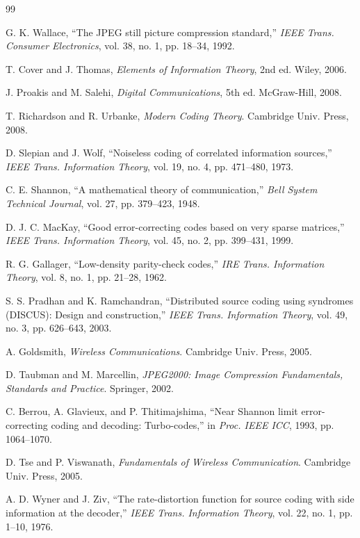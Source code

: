 \documentclass[12pt, a4paper]{article}
\begin{document}
\begin{thebibliography}{99}

G. K. Wallace, ``The JPEG still picture compression standard,'' \textit{IEEE Trans. Consumer Electronics}, vol. 38, no. 1, pp. 18--34, 1992.

T. Cover and J. Thomas, \textit{Elements of Information Theory}, 2nd ed. Wiley, 2006.

J. Proakis and M. Salehi, \textit{Digital Communications}, 5th ed. McGraw-Hill, 2008.

T. Richardson and R. Urbanke, \textit{Modern Coding Theory}. Cambridge Univ. Press, 2008.

D. Slepian and J. Wolf, ``Noiseless coding of correlated information sources,'' \textit{IEEE Trans. Information Theory}, vol. 19, no. 4, pp. 471--480, 1973.

C. E. Shannon, ``A mathematical theory of communication,'' \textit{Bell System Technical Journal}, vol. 27, pp. 379--423, 1948.

D. J. C. MacKay, ``Good error-correcting codes based on very sparse matrices,'' \textit{IEEE Trans. Information Theory}, vol. 45, no. 2, pp. 399--431, 1999.

R. G. Gallager, ``Low-density parity-check codes,'' \textit{IRE Trans. Information Theory}, vol. 8, no. 1, pp. 21--28, 1962.

S. S. Pradhan and K. Ramchandran, ``Distributed source coding using syndromes (DISCUS): Design and construction,'' \textit{IEEE Trans. Information Theory}, vol. 49, no. 3, pp. 626--643, 2003.

A. Goldsmith, \textit{Wireless Communications}. Cambridge Univ. Press, 2005.

D. Taubman and M. Marcellin, \textit{JPEG2000: Image Compression Fundamentals, Standards and Practice}. Springer, 2002.

C. Berrou, A. Glavieux, and P. Thitimajshima, ``Near Shannon limit error-correcting coding and decoding: Turbo-codes,'' in \textit{Proc. IEEE ICC}, 1993, pp. 1064--1070.

D. Tse and P. Viswanath, \textit{Fundamentals of Wireless Communication}. Cambridge Univ. Press, 2005.

A. D. Wyner and J. Ziv, ``The rate-distortion function for source coding with side information at the decoder,'' \textit{IEEE Trans. Information Theory}, vol. 22, no. 1, pp. 1--10, 1976.

\end{thebibliography}
\end{document}
